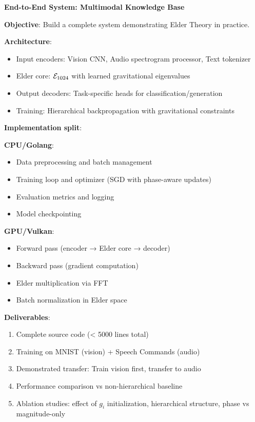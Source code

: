 \begin{coding}
\textbf{End-to-End System: Multimodal Knowledge Base}

\textbf{Objective}: Build a complete system demonstrating Elder Theory in practice.

\textbf{Architecture}:
\begin{itemize}
\item Input encoders: Vision CNN, Audio spectrogram processor, Text tokenizer
\item Elder core: $\mathcal{E}_{1024}$ with learned gravitational eigenvalues
\item Output decoders: Task-specific heads for classification/generation
\item Training: Hierarchical backpropagation with gravitational constraints
\end{itemize}

\textbf{Implementation split}:

\textbf{CPU/Golang}:
\begin{itemize}
\item Data preprocessing and batch management
\item Training loop and optimizer (SGD with phase-aware updates)
\item Evaluation metrics and logging
\item Model checkpointing
\end{itemize}

\textbf{GPU/Vulkan}:
\begin{itemize}
\item Forward pass (encoder → Elder core → decoder)
\item Backward pass (gradient computation)
\item Elder multiplication via FFT
\item Batch normalization in Elder space
\end{itemize}

\textbf{Deliverables}:
\begin{enumerate}
\item Complete source code (< 5000 lines total)
\item Training on MNIST (vision) + Speech Commands (audio)
\item Demonstrated transfer: Train vision first, transfer to audio
\item Performance comparison vs non-hierarchical baseline
\item Ablation studies: effect of $g_i$ initialization, hierarchical structure, phase vs magnitude-only
\end{enumerate}


\end{coding}
